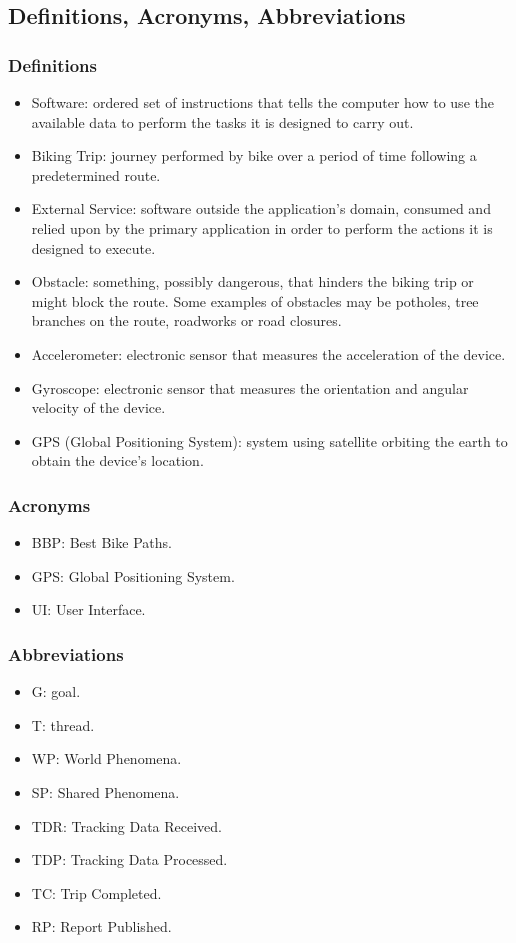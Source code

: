 \subsection{Definitions, Acronyms, Abbreviations} %
\subsubsection{Definitions}
\begin{itemize}
    \item Software: ordered set of instructions that tells the computer how to use the available data to perform the tasks it is designed to carry out.
    \item Biking Trip: journey performed by bike over a period of time following a predetermined route.
    \item External Service: software outside the application’s domain, consumed and relied upon by the primary application in order to perform the actions it is designed to execute.
    \item Obstacle: something, possibly dangerous, that hinders the biking trip or might block the route. Some examples of obstacles may be potholes, tree branches on the route, roadworks or road closures.
    \item Accelerometer: electronic sensor that measures the acceleration of the device.
    \item Gyroscope: electronic sensor that measures the orientation and angular velocity of the device.
    \item GPS (Global Positioning System): system using satellite orbiting the earth to obtain the device’s location. 
\end{itemize}

\subsubsection{Acronyms}
\begin{itemize}
    \item BBP: Best Bike Paths.
    \item GPS: Global Positioning System.
    \item UI: User Interface.
\end{itemize}

\subsubsection{Abbreviations}
\begin{itemize}
    \item G: goal.
    \item T: thread.
    \item WP: World Phenomena.
    \item SP: Shared Phenomena.
    \item TDR: Tracking Data Received.
    \item TDP: Tracking Data Processed.
    \item TC: Trip Completed.
    \item RP: Report Published.
\end{itemize}

